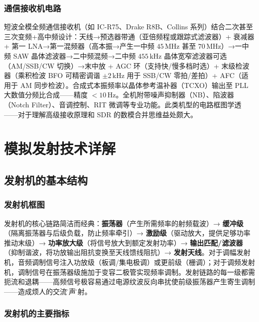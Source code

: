 \documentclass[12pt,UTF8]{ctexbook}
\begin{document}
\subsection{通信接收机电路}

短波全模全频通信接收机（如 IC-R75、Drake R8B、Collins 系列）结合二次甚至三次变频+高中频设计：天线→预选器带通（亚倍频程或跟踪式滤波器）+ 衰减器 + 第一 LNA→第一混频器（高本振→产生一中频 $45\,\mathrm{MHz}$ 甚至 $70\,\mathrm{MHz}$）→一中频 SAW 晶体滤波器→二中频混频→二中频 $455\,\mathrm{kHz}$ 晶体宽窄滤波器可选（AM/SSB/CW 切换）→末中放 + AGC 环（支持快/慢多档时选）+ 末级检波器（乘积检波 BFO 可精密调谐 $\pm2\,\mathrm{kHz}$ 用于 SSB/CW 零拍/差拍）+ AFC（适用于 AM 同步检波）。合成式本振频率以晶体参考温补器（TCXO）输出至 PLL 大数值分频比合成——精度 $<10\,\mathrm{Hz}$。全机附带噪声抑制器（NB）、陷波器（Notch Filter）、音调控制、RIT 微调等专业功能。此类机型的电路框图学透——对于理解高级接收原理和 SDR 的数模合并思维益处颇大。


\chapter{模拟发射技术详解}
\label{chap:analog_tx}

\section{发射机的基本结构}
\label{sec:tx_structure}

\subsection{发射机框图}

发射机的核心链路简洁而经典：\textbf{振荡器}（产生所需频率的射频载波）→ \textbf{缓冲级}（隔离振荡器与后级负载，防止频率牵引）→ \textbf{激励级}（驱动放大，提供足够功率推动末级）→ \textbf{功率放大级}（将信号放大到额定发射功率）→ \textbf{输出匹配/滤波器}（抑制谐波，将功放输出阻抗变换至天线馈线阻抗）→ \textbf{发射天线}。对于调幅发射机，音频调制信号注入功放级（板调/集电极调）或更前级（栅调）；对于调频发射机，调制信号在振荡器级施加于变容二极管实现频率调制。发射链路的每一级都需扼流和退耦——高频信号极容易通过电源纹波反向串扰使前级振荡器产生寄生调制——造成烦人的交流\"嗡声\"发射。

\subsection{发射机的主要指标}
\end{document}
